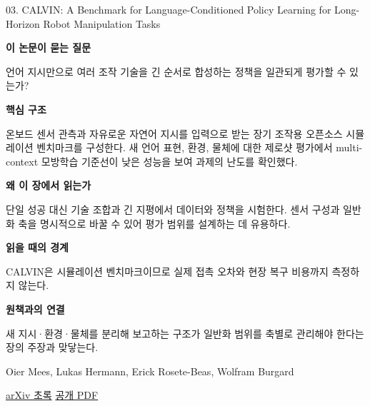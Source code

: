 \documentclass[11pt,openany]{book}
\begin{document}
\begin{termcard}{03. CALVIN: A Benchmark for Language-Conditioned Policy Learning for Long-Horizon Robot Manipulation Tasks}

\par

\medskip

{\sffamily\bfseries\color{deepblue} 이 논문이 묻는 질문}\par

언어 지시만으로 여러 조작 기술을 긴 순서로 합성하는 정책을 일관되게 평가할 수 있는가?

\smallskip

{\sffamily\bfseries\color{deepblue} 핵심 구조}\par

온보드 센서 관측과 자유로운 자연어 지시를 입력으로 받는 장기 조작용 오픈소스 시뮬레이션 벤치마크를 구성한다. 새 언어 표현, 환경, 물체에 대한 제로샷 평가에서 multi-context 모방학습 기준선이 낮은 성능을 보여 과제의 난도를 확인했다.

\smallskip

{\sffamily\bfseries\color{deepblue} 왜 이 장에서 읽는가}\par

단일 성공 대신 기술 조합과 긴 지평에서 데이터와 정책을 시험한다. 센서 구성과 일반화 축을 명시적으로 바꿀 수 있어 평가 범위를 설계하는 데 유용하다.

\smallskip

{\sffamily\bfseries\color{coral} 읽을 때의 경계}\par

CALVIN은 시뮬레이션 벤치마크이므로 실제 접촉 오차와 현장 복구 비용까지 측정하지 않는다.

\smallskip

{\sffamily\bfseries\color{teal} 원책과의 연결}\par

새 지시·환경·물체를 분리해 보고하는 구조가 일반화 범위를 축별로 관리해야 한다는 장의 주장과 맞닿는다.

\medskip

{\footnotesize\color{muted} Oier Mees, Lukas Hermann, Erick Rosete-Beas, Wolfram Burgard\par

\href{https://arxiv.org/abs/2112.03227}{arXiv 초록} \quad \href{https://arxiv.org/pdf/2112.03227}{공개 PDF}\par}

\end{termcard}
\end{document}
